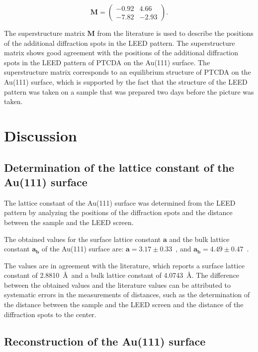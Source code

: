 \documentclass[fontsize=11pt,reqno,a4paper,oneside]{scrartcl}
\begin{document}
\begin{equation*}
    \mathbf{M} =
\begin{pmatrix}
-0.92 & 4.66 \\
-7.82 & -2.93
\end{pmatrix}.
\end{equation*}

The superstructure matrix $\mathbf{M}$ from the literature\autocite{Kilian2002,Kilian2006} is used to describe the positions of the additional diffraction spots in the \ac{LEED} pattern. The superstructure matrix shows good agreement with the positions of the additional diffraction spots in the \ac{LEED} pattern of \ac{PTCDA} on the Au(111) surface. The superstructure matrix corresponds to an equilibrium structure of \ac{PTCDA} on the Au(111) surface, which is supported by the fact that the structure of the \ac{LEED} pattern was taken on a sample that was prepared two days before the picture was taken.


\clearpage
\section{Discussion}

\subsection{Determination of the lattice constant of the Au(111) surface}

The lattice constant of the Au(111) surface was determined from the \ac{LEED} pattern by analyzing the positions of the diffraction spots and the distance between the sample and the \ac{LEED} screen.

The obtained values for the surface lattice constant $\mathbf{a}$ and the bulk lattice constant $\mathbf{a_b}$ of the Au(111) surface are: $\mathbf{a} = 3.17\pm0.33$~\text{\AA}, and $\mathbf{a_b} = 4.49\pm0.47$~\text{\AA}.

The values are in agreement with the literature\autocite{Dutta1963}, which reports a surface lattice constant of 2.8810~\AA~and a bulk lattice constant of 4.0743~\AA. The difference between the obtained values and the literature values can be attributed to systematic errors in the measurements of distances, such as the determination of the distance between the sample and the \ac{LEED} screen and the distance of the diffraction spots to the center. 

\subsection{Reconstruction of the Au(111) surface}
\end{document}
